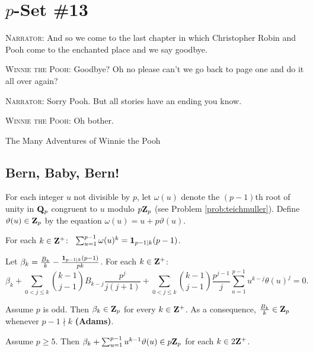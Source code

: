 \setcounter{chapter}{13}
\chapter*{$p$-Set \#13}\label{chap:chap13}

\epigraph{\textsc{Narrator}: And so we come to the last chapter in which Christopher Robin and Pooh come to the enchanted place and we say goodbye.

\textsc{Winnie the Pooh}: Goodbye? Oh no please can't we go back to page one and do it all over again?

\textsc{Narrator}: Sorry Pooh. But all stories have an ending you know.

\textsc{Winnie the Pooh}: Oh bother.}
{{The Many Adventures of Winnie the Pooh}}


\section*{Bern, Baby, Bern!}

For each integer $u$ not divisible by $p$, let $\omega(u)$ denote the $(p-1)$th root of unity in $\mathbf{Q}_p$ congruent to $u$ modulo $p\mathbf{Z}_p$ (see Problem \ref{prob:teichmuller}). Define $\vartheta(u)\in \mathbf{Z}_p$ by the equation $\omega(u) = u + p \vartheta(u)$.

\begin{prob}\label{prob:fundamentalidentity} For each $k\in \mathbf{Z}^{+}$:~  $\sum_{u=1}^{p-1} \omega(u)^{k} = \mathbf{1}_{p-1\mid k} (p-1)$.
\end{prob}

\begin{prob}\label{prob:betakintegral} Let $\beta_k = \frac{B_k}{k} - \frac{\mathbf{1}_{p-1\mid k}(p-1)}{pk}$. For each $k \in \mathbf{Z}^{+}$: \\
\[ \beta_k + \sum_{0 < j \le k} \binom{k-1}{j-1} B_{k-j}\frac{p^{j}}{j(j+1)}+\sum_{0 < j \le k}\binom{k-1}{j-1}\frac{p^{j-1}}{j}\sum_{u=1}^{p-1}u^{k-j}\theta(u)^j =0. \]
\end{prob}

\begin{prob}\label{prob:adams} Assume $p$ is odd. Then $\beta_k \in \mathbf{Z}_{p}$ for every $k\in \mathbf{Z}^{+}$. As a consequence, $\frac{B_k}{k} \in \mathbf{Z}_{p}$ whenever $p-1\nmid k$ \textbf{(Adams)}.
\end{prob}


\begin{prob}\label{prob:prekummer} Assume $p\ge 5$. Then $\beta_{k}+\sum_{u=1}^{p-1} u^{k-1}\vartheta(u) \in p\mathbf{Z}_{p}$ for each $k \in 2\mathbf{Z}^{+}$.
\end{prob}

